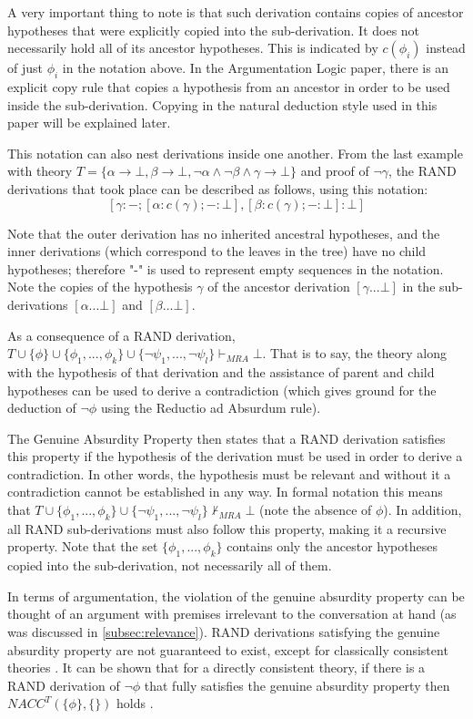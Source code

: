 \documentclass[11pt,twoside,a4paper]{report}
\begin{document}
A very important thing to note is that such derivation contains copies of ancestor hypotheses that were explicitly copied into the sub-derivation. It does not necessarily hold all of its ancestor hypotheses. This is indicated by $c(\phi_i)$ instead of just $\phi_i$ in the notation above. In the Argumentation Logic paper, there is an explicit copy rule that copies a hypothesis from an ancestor in order to be used inside the sub-derivation. Copying in the natural deduction style used in this paper will be explained later.

This notation can also nest derivations inside one another. From the last example with theory $T = \{\alpha\rightarrow\bot, \beta\rightarrow\bot, \neg\alpha\wedge\neg\beta\wedge\gamma\rightarrow\bot\}$ and proof of $\neg\gamma$, the RAND derivations that took place can be described as follows, using this notation:
\[[\gamma:-;[\alpha:c(\gamma);-:\bot],[\beta:c(\gamma);-:\bot]:\bot]\]

Note that the outer derivation has no inherited ancestral hypotheses, and the inner derivations (which correspond to the leaves in the tree) have no child hypotheses; therefore "-" is used to represent empty sequences in the notation. Note the copies of the hypothesis $\gamma$ of the ancestor derivation $[\gamma ... \bot]$ in the sub-derivations $[\alpha ... \bot]$ and $[\beta ... \bot]$.

As a consequence of a RAND derivation, $T\cup\{\phi\}\cup\{\phi_1, ..., \phi_k\}\cup\{\neg\psi_1, ..., \neg\psi_l\}\vdash_{MRA}\bot$. That is to say, the theory along with the hypothesis of that derivation and the assistance of parent and child hypotheses can be used to derive a contradiction (which gives ground for the deduction of $\neg\phi$ using the Reductio ad Absurdum rule).

The Genuine Absurdity Property then states that a RAND derivation satisfies this property if the hypothesis of the derivation must be used in order to derive a contradiction. In other words, the hypothesis must be relevant and without it a contradiction cannot be established in any way. In formal notation this means that $T\cup\{\phi_1, ..., \phi_k\}\cup\{\neg\psi_1, ..., \neg\psi_l\}\nvdash_{MRA}\bot$ (note the absence of $\phi$). In addition, all RAND sub-derivations must also follow this property, making it a recursive property. Note that the set $\{\phi_1, ..., \phi_k\}$ contains only the ancestor hypotheses copied into the sub-derivation, not necessarily all of them.

In terms of argumentation, the violation of the genuine absurdity property can be thought of an argument with premises irrelevant to the conversation at hand (as was discussed in \autoref{subsec:relevance}). RAND derivations satisfying the genuine absurdity property are not guaranteed to exist, except for classically consistent theories \citep*[p. 9]{alpaper}. It can be shown that for a directly consistent theory, if there is a RAND derivation of $\neg\phi$ that fully satisfies the genuine absurdity property then $NACC^T(\{\phi\},\{\})$ holds \citep*[p. 19]{alpaper}.
\end{document}
